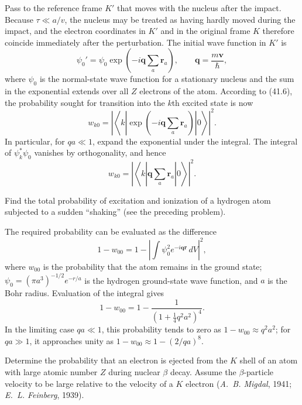 \SolutionHeading Pass to the reference frame $K'$ that moves with the nucleus
after the impact. Because $\tau\ll a/v$, the nucleus may be treated as having
hardly moved during the impact, and the electron coordinates in $K'$ and in
the original frame $K$ therefore coincide immediately after the perturbation.
The initial wave function in $K'$ is
\[
  \psi_0'=\psi_0\exp\left(-i\mathbf q\sum_a\mathbf r_a\right),
  \qquad \mathbf q=\frac{m\mathbf v}{\hbar},
\]
where $\psi_0$ is the normal-state wave function for a stationary nucleus and
the sum in the exponential extends over all $Z$ electrons of the atom.
According to (41.6), the probability sought for transition into the $k$th
excited state is now
\[
  w_{k0}=\left|\left\langle k\left|
   \exp\left(-i\mathbf q\sum_a\mathbf r_a\right)\right|0\right\rangle\right|^2.
\]
In particular, for $qa\ll1$, expand the exponential under the integral. The
integral of $\psi_k^*\psi_0$ vanishes by orthogonality, and hence
\[
  w_{k0}=\left|\left\langle k\left|
    \mathbf q\sum_a\mathbf r_a\right|0\right\rangle\right|^2.
\]

 Find the total probability of excitation and ionization
of a hydrogen atom subjected to a sudden ``shaking'' (see the preceding
problem).

\SolutionHeading The required probability can be evaluated as the difference
\[
  1-w_{00}=1-\left|\int\psi_0^2e^{-i\mathbf q\mathbf r}\,dV\right|^2,
\]
where $w_{00}$ is the probability that the atom remains in the ground state;
$\psi_0=(\pi a^3)^{-1/2}e^{-r/a}$ is the hydrogen ground-state wave function,
and $a$ is the Bohr radius. Evaluation of the integral gives
\[
  1-w_{00}=1-\frac1{(1+\tfrac14q^2a^2)^4}.
\]
In the limiting case $qa\ll1$, this probability tends to zero as
$1-w_{00}\approx q^2a^2$; for $qa\gg1$, it approaches unity as
$1-w_{00}\approx1-(2/qa)^8$.

 Determine the probability that an electron is ejected
from the $K$ shell of an atom with large atomic number $Z$ during nuclear
$\beta$ decay. Assume the $\beta$-particle velocity to be large relative to
the velocity of a $K$ electron (\emph{A.~B. Migdal}, 1941;
\emph{E.~L. Feinberg}, 1939).

